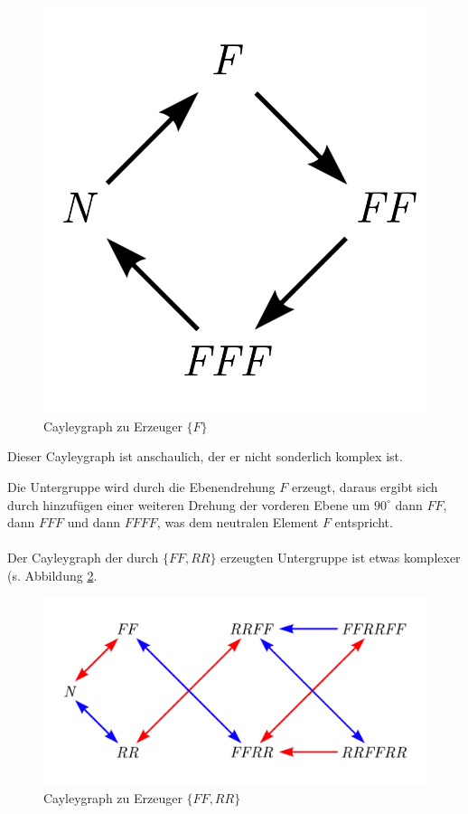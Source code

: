 \documentclass[12pt,a4paper, usenames, dvipsnames]{article}
\begin{document}
\begin{figure}[h]
\centering
\includegraphics[scale=0.7]{Cayleygraph1.png}
\caption{Cayleygraph zu Erzeuger $\{ F \}$}
\label{27}
\end{figure}

Dieser Cayleygraph ist anschaulich, der er nicht sonderlich komplex ist.

Die Untergruppe wird durch die Ebenendrehung $F$ erzeugt, daraus ergibt sich durch hinzufügen einer weiteren Drehung der vorderen Ebene um $90^\circ$ dann $FF$, dann $FFF$ und dann $FFFF$, was dem neutralen Element $F$ entspricht.
\\
\\
Der Cayleygraph der durch $\{ FF, RR \}$ erzeugten Untergruppe ist etwas komplexer (s. Abbildung \ref{28}. 

\begin{figure}[h]
\centering
\includegraphics[scale=0.6]{Cayleygraph2.png}
\caption{Cayleygraph zu Erzeuger $\{ FF, RR \}$}
\label{28}
\end{figure}
\end{document}
